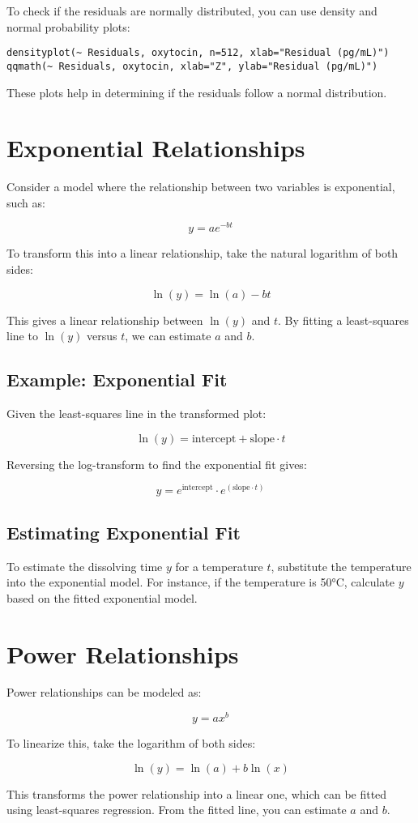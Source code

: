 \documentclass{article}
\begin{document}
To check if the residuals are normally distributed, you can use density and normal probability plots:

\begin{verbatim}
densityplot(~ Residuals, oxytocin, n=512, xlab="Residual (pg/mL)")
qqmath(~ Residuals, oxytocin, xlab="Z", ylab="Residual (pg/mL)")
\end{verbatim}

These plots help in determining if the residuals follow a normal distribution.

\section{Exponential Relationships}

Consider a model where the relationship between two variables is exponential, such as:

\[
y = ae^{-bt}
\]

To transform this into a linear relationship, take the natural logarithm of both sides:

\[
\ln(y) = \ln(a) - bt
\]

This gives a linear relationship between \(\ln(y)\) and \(t\). By fitting a least-squares line to \(\ln(y)\) versus \(t\), we can estimate \(a\) and \(b\). 

\subsection{Example: Exponential Fit}

Given the least-squares line in the transformed plot:

\[
\ln(y) = \text{intercept} + \text{slope} \cdot t
\]

Reversing the log-transform to find the exponential fit gives:

\[
y = e^{\text{intercept}} \cdot e^{(\text{slope} \cdot t)}
\]

\subsection{Estimating Exponential Fit}

To estimate the dissolving time \(y\) for a temperature \(t\), substitute the temperature into the exponential model. For instance, if the temperature is 50°C, calculate \(y\) based on the fitted exponential model.

\section{Power Relationships}

Power relationships can be modeled as:

\[
y = a x^b
\]

To linearize this, take the logarithm of both sides:

\[
\ln(y) = \ln(a) + b \ln(x)
\]

This transforms the power relationship into a linear one, which can be fitted using least-squares regression. From the fitted line, you can estimate \(a\) and \(b\).
\end{document}
